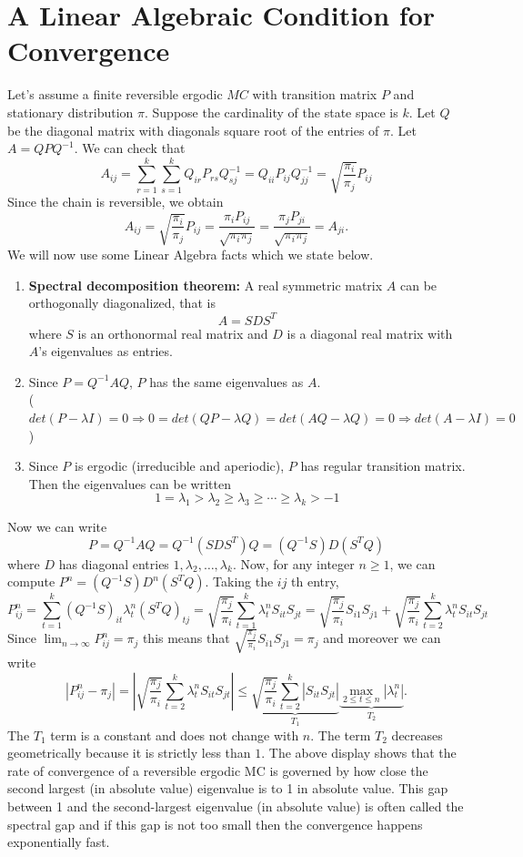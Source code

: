 \documentclass[11pt]{elegantbook}
\begin{document}
\section{A Linear Algebraic Condition for Convergence}
Let's assume a finite reversible ergodic $M C$ with transition matrix $P$ and stationary distribution $\pi$. Suppose the cardinality of the state space is $k$. Let $Q$ be the diagonal matrix with diagonals square root of the entries of $\pi$. Let $A=Q P Q^{-1}$.
We can check that
$$
A_{i j}=\sum_{r=1}^k \sum_{s=1}^k Q_{i r} P_{r s} Q_{s j}^{-1}=Q_{i i} P_{i j} Q_{j j}^{-1}=\sqrt{\frac{\pi_i}{\pi_j}} P_{i j}
$$
Since the chain is reversible, we obtain
$$
A_{i j}=\sqrt{\frac{\pi_i}{\pi_j}} P_{i j}=\frac{\pi_i P_{i j}}{\sqrt{\pi_i \pi_j}}=\frac{\pi_j P_{j i}}{\sqrt{\pi_i \pi_j}}=A_{j i} .
$$
We will now use some Linear Algebra facts which we state below.
\begin{enumerate}[(1)]
    \item \textbf{Spectral decomposition theorem:} A real symmetric matrix $A$ can be orthogonally diagonalized, that is $$A=S D S^T$$ where $S$ is an orthonormal real matrix and $D$ is a diagonal real matrix with $A$'s eigenvalues as entries.
    \item Since $P=Q^{-1}AQ$, $P$ has the same eigenvalues as $A$.\\($det(P-\lambda I)=0 \Rightarrow 0=det(QP-\lambda Q)=det(AQ-\lambda Q)=0 \Rightarrow det(A-\lambda I)=0$)
    \item Since $P$ is ergodic (irreducible and aperiodic), $P$ has regular transition matrix. Then the eigenvalues can be written $$1=\lambda_1>\lambda_2\geq \lambda_3\geq \cdots\geq \lambda_k>-1$$
\end{enumerate}
Now we can write
$$
P=Q^{-1} A Q=Q^{-1}\left(S D S^T\right) Q=\left(Q^{-1} S\right) D\left(S^T Q\right)
$$
where $D$ has diagonal entries $1, \lambda_2, \ldots, \lambda_k$. Now, for any integer $n \geq 1$, we can compute $P^n=\left(Q^{-1} S\right) D^n\left(S^T Q\right)$. Taking the $i j$ th entry,
$$
P_{i j}^n=\sum_{t=1}^k\left(Q^{-1} S\right)_{i t} \lambda_t^n\left(S^T Q\right)_{t j}=\sqrt{\frac{\pi_j}{\pi_i}} \sum_{t=1}^k \lambda_t^n S_{i t} S_{j t}=\sqrt{\frac{\pi_j}{\pi_i}} S_{i 1} S_{j 1}+\sqrt{\frac{\pi_j}{\pi_i}} \sum_{t=2}^k \lambda_t^n S_{i t} S_{j t}
$$
Since $\lim _{n \rightarrow \infty} P_{i j}^n=\pi_j$ this means that $\sqrt{\frac{\pi_j}{\pi_i}} S_{i 1} S_{j 1}=\pi_j$ and moreover we can write
$$
\left|P_{i j}^n-\pi_j\right|=\left|\sqrt{\frac{\pi_j}{\pi_i}} \sum_{t=2}^k \lambda_t^n S_{i t} S_{j t}\right| \leq \underbrace{\sqrt{\frac{\pi_j}{\pi_i}} \sum_{t=2}^k\left|S_{i t} S_{j t}\right|}_{T_1} \underbrace{\max _{2 \leq t \leq n}\left|\lambda_t^n\right|}_{T_2} .
$$
The $T_1$ term is a constant and does not change with $n$. The term $T_2$ decreases geometrically because it is strictly less than $1$. The above display shows that the rate of convergence of a reversible ergodic $\mathrm{MC}$ is governed by how close the second largest (in absolute value) eigenvalue is to 1 in absolute value. This gap between 1 and the second-largest eigenvalue (in absolute value) is often called the spectral gap and if this gap is not too small then the convergence happens exponentially fast.
\end{document}
